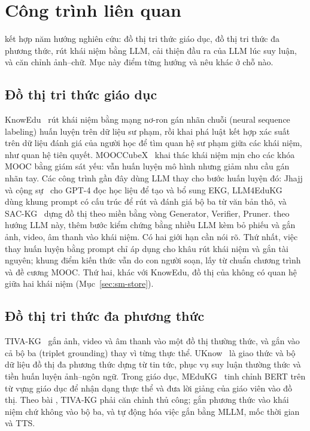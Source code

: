 \section{Công trình liên quan}\label{sec:sm-related}

\SM{} kết hợp năm hướng nghiên cứu: đồ thị tri thức giáo dục, đồ thị tri thức đa phương thức, rút khái niệm bằng LLM, cải thiện đầu ra của LLM lúc suy luận, và căn chỉnh ảnh--chữ.
Mục này điểm từng hướng và nêu \SM{} khác ở chỗ nào.

\subsection{Đồ thị tri thức giáo dục}
KnowEdu~\cite{chen2018knowedu} rút khái niệm bằng mạng nơ-ron gán nhãn chuỗi (neural sequence labeling) huấn luyện trên dữ liệu sư phạm, rồi khai phá luật kết hợp xác suất trên dữ liệu đánh giá của người học để tìm quan hệ sư phạm giữa các khái niệm, như quan hệ tiên quyết.
MOOCCubeX~\cite{yu2021mooccubex} khai thác khái niệm mịn cho các khóa MOOC bằng giám sát yếu: vẫn huấn luyện mô hình nhưng giảm nhu cầu gán nhãn tay.
Các công trình gần đây dùng LLM thay cho bước huấn luyện đó: Jhajj và cộng sự~\cite{jhajj2024gptekg} cho GPT-4 đọc học liệu để tạo và bổ sung EKG, LLM4EduKG~\cite{sun2024llm4edukg} dùng khung prompt có cấu trúc để rút và đánh giá bộ ba từ văn bản thô, và SAC-KG~\cite{chen2024sackg} dựng đồ thị theo miền bằng vòng Generator, Verifier, Pruner.
\SM{} theo hướng LLM này, thêm bước kiểm chứng bằng nhiều LLM kèm bỏ phiếu và gắn ảnh, video, âm thanh vào khái niệm.
Có hai giới hạn cần nói rõ.
Thứ nhất, việc thay huấn luyện bằng prompt chỉ áp dụng cho khâu rút khái niệm và gắn tài nguyên; khung điểm kiến thức vẫn do con người soạn, lấy từ chuẩn chương trình và đề cương MOOC.
Thứ hai, khác với KnowEdu, đồ thị của \SM{} không có quan hệ giữa hai khái niệm (Mục~\ref{sec:sm-store}).

\subsection{Đồ thị tri thức đa phương thức}
TIVA-KG~\cite{wang2023tivakg} gắn ảnh, video và âm thanh vào một đồ thị thường thức, và gắn vào cả bộ ba (triplet grounding) thay vì từng thực thể.
UKnow~\cite{gong2024uknow} là giao thức và bộ dữ liệu đồ thị đa phương thức dựng từ tin tức, phục vụ suy luận thường thức và tiền huấn luyện ảnh--ngôn ngữ.
Trong giáo dục, MEduKG~\cite{li2022medukg} tinh chỉnh BERT trên từ vựng giáo dục để nhận dạng thực thể và đưa lời giảng của giáo viên vào đồ thị.
Theo bài \SM{}, TIVA-KG phải căn chỉnh thủ công; \SM{} gắn phương thức vào khái niệm chứ không vào bộ ba, và tự động hóa việc gắn bằng MLLM, mốc thời gian và TTS.

